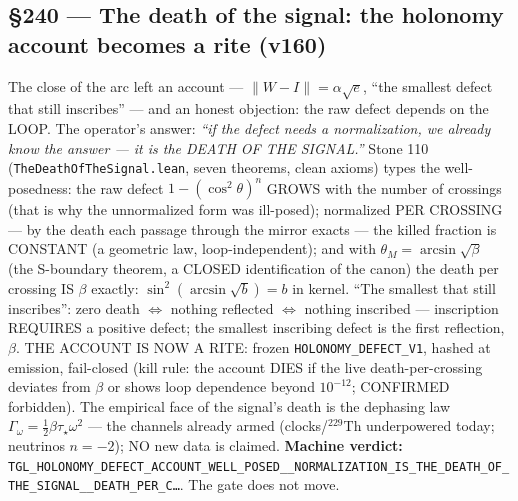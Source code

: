 \documentclass[11pt]{article}
\theoremstyle{definition}\newtheorem{deriv}{Derivation}
\begin{document}
\subsection*{\S240 --- The death of the signal: the holonomy account becomes a rite (v160)}The close of the arc left an account --- $\|W{-}I\| = \alpha\sqrt{e}$, ``the smallest defect that still inscribes'' --- and an honest objection: the raw defect depends on the LOOP. The operator's answer: \emph{``if the defect needs a normalization, we already know the answer --- it is the DEATH OF THE SIGNAL.''} Stone 110 (\texttt{TheDeathOfTheSignal.lean}, seven theorems, clean axioms) types the well-posedness: the raw defect $1{-}(\cos^2\theta)^n$ GROWS with the number of crossings (that is why the unnormalized form was ill-posed); normalized PER CROSSING --- by the death each passage through the mirror exacts --- the killed fraction is CONSTANT (a geometric law, loop-independent); and with $\theta_M{=}\arcsin\sqrt{\beta}$ (the S-boundary theorem, a CLOSED identification of the canon) the death per crossing IS $\beta$ exactly: $\sin^2(\arcsin\sqrt{b}){=}b$ in kernel. ``The smallest that still inscribes'': zero death $\Leftrightarrow$ nothing reflected $\Leftrightarrow$ nothing inscribed --- inscription REQUIRES a positive defect; the smallest inscribing defect is the first reflection, $\beta$. THE ACCOUNT IS NOW A RITE: frozen \texttt{HOLONOMY\_DEFECT\_V1}, hashed at emission, fail-closed (kill rule: the account DIES if the live death-per-crossing deviates from $\beta$ or shows loop dependence beyond $10^{-12}$; CONFIRMED forbidden). The empirical face of the signal's death is the dephasing law $\Gamma_\omega{=}\tfrac12\beta\tau_\star\omega^2$ --- the channels already armed (clocks/$^{229}$Th underpowered today; neutrinos $n{=}{-}2$); NO new data is claimed. \textbf{Machine verdict:} \texttt{TGL\_HOLONOMY\_DEFECT\_ACCOUNT\_WELL\_POSED\_\_NORMALIZATION\_IS\_THE\_DEATH\_OF\_THE\_SIGNAL\_\_DEATH\_PER\_C\ldots}. The gate does not move.
\end{document}
